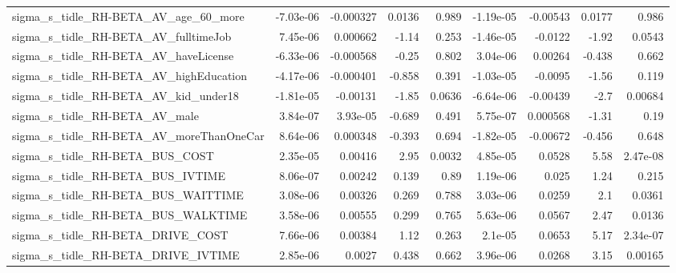 \begin{tabular}{lrrrrrrrr}
sigma\_s\_tidle\_RH-BETA\_AV\_age\_60\_more               &   -7.03e-06 &    -0.000327 &   0.0136 &    0.989 &  -1.19e-05 &    -0.00543 &       0.0177 &         0.986 \\
sigma\_s\_tidle\_RH-BETA\_AV\_fulltimeJob               &    7.45e-06 &     0.000662 &    -1.14 &    0.253 &  -1.46e-05 &     -0.0122 &        -1.92 &        0.0543 \\
sigma\_s\_tidle\_RH-BETA\_AV\_haveLicense               &   -6.33e-06 &    -0.000568 &    -0.25 &    0.802 &   3.04e-06 &     0.00264 &       -0.438 &         0.662 \\
sigma\_s\_tidle\_RH-BETA\_AV\_highEducation             &   -4.17e-06 &    -0.000401 &   -0.858 &    0.391 &  -1.03e-05 &     -0.0095 &        -1.56 &         0.119 \\
sigma\_s\_tidle\_RH-BETA\_AV\_kid\_under18               &   -1.81e-05 &     -0.00131 &    -1.85 &   0.0636 &  -6.64e-06 &    -0.00439 &         -2.7 &       0.00684 \\
sigma\_s\_tidle\_RH-BETA\_AV\_male                      &    3.84e-07 &     3.93e-05 &   -0.689 &    0.491 &   5.75e-07 &    0.000568 &        -1.31 &          0.19 \\
sigma\_s\_tidle\_RH-BETA\_AV\_moreThanOneCar            &    8.64e-06 &     0.000348 &   -0.393 &    0.694 &  -1.82e-05 &    -0.00672 &       -0.456 &         0.648 \\
sigma\_s\_tidle\_RH-BETA\_BUS\_COST                     &    2.35e-05 &      0.00416 &     2.95 &   0.0032 &   4.85e-05 &      0.0528 &         5.58 &      2.47e-08 \\
sigma\_s\_tidle\_RH-BETA\_BUS\_IVTIME                   &    8.06e-07 &      0.00242 &    0.139 &     0.89 &   1.19e-06 &       0.025 &         1.24 &         0.215 \\
sigma\_s\_tidle\_RH-BETA\_BUS\_WAITTIME                 &    3.08e-06 &      0.00326 &    0.269 &    0.788 &   3.03e-06 &      0.0259 &          2.1 &        0.0361 \\
sigma\_s\_tidle\_RH-BETA\_BUS\_WALKTIME                 &    3.58e-06 &      0.00555 &    0.299 &    0.765 &   5.63e-06 &      0.0567 &         2.47 &        0.0136 \\
sigma\_s\_tidle\_RH-BETA\_DRIVE\_COST                   &    7.66e-06 &      0.00384 &     1.12 &    0.263 &    2.1e-05 &      0.0653 &         5.17 &      2.34e-07 \\
sigma\_s\_tidle\_RH-BETA\_DRIVE\_IVTIME                 &    2.85e-06 &       0.0027 &    0.438 &    0.662 &   3.96e-06 &      0.0268 &         3.15 &       0.00165 \\

\end{tabular}

